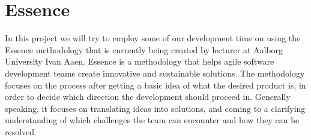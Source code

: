 
\section{Essence}
\label{sec:essence}

In this project we will try to employ some of our development time on using the Essence methodology that is currently being created by lecturer at Aalborg University Ivan Aaen. Essence is a methodology that helps agile software development teams create innovative and sustainable solutions. The methodology focuses on the process after getting a basic idea of what the desired product is, in order to decide which direction the development should proceed in. Generally speaking, it focuses on translating ideas into solutions, and coming to a clarifying understanding of which challenges the team can encounter and how they can he resolved.  

 

